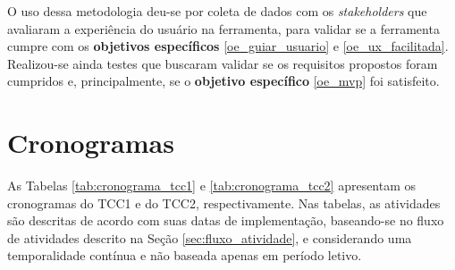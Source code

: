 O uso dessa metodologia deu-se por coleta de dados com os \textit{stakeholders} que avaliaram a experiência do usuário na ferramenta, para validar se a ferramenta cumpre com os \textbf{objetivos específicos} \ref{oe_guiar_usuario} e \ref{oe_ux_facilitada}. Realizou-se ainda testes que buscaram validar se os requisitos propostos foram cumpridos e, principalmente, se o \textbf{objetivo específico} \ref{oe_mvp} foi satisfeito.

\section{Cronogramas}

\label{sec:cronograma_met}

As Tabelas \ref{tab:cronograma_tcc1} e \ref{tab:cronograma_tcc2} apresentam os cronogramas do TCC1 e do TCC2, respectivamente. Nas tabelas, as atividades são descritas de acordo com suas datas de implementação, baseando-se no fluxo de atividades descrito na Seção \ref{sec:fluxo_atividade}, e considerando uma temporalidade contínua e não baseada apenas em período letivo.

\begin{table}[H]
    \centering
    \caption{Cronograma de Atividades do TCC1}
    \label{tab:cronograma_tcc1}
\end{table}

